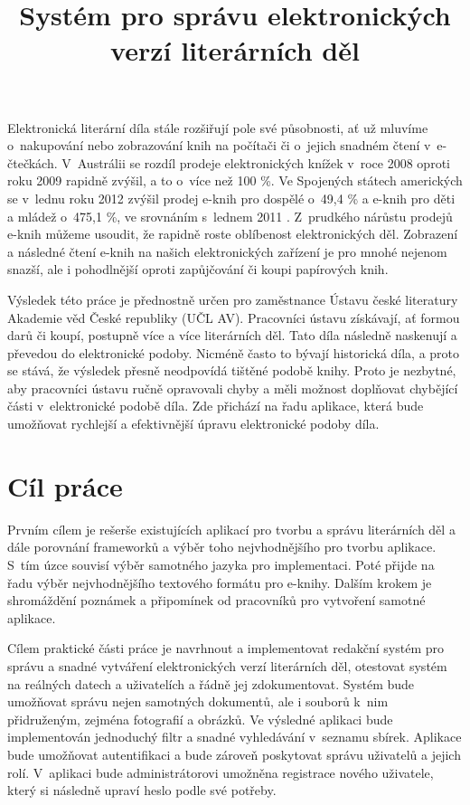 \documentclass[thesis=B,czech]{FITthesis}[2012/06/26]
\title{Systém pro správu elektronických verzí literárních děl}
\begin{document}

\begin{introduction}

    Elektronická literární díla stále rozšiřují pole své působnosti, ať už mluvíme o~nakupování nebo zobrazování knih na počítači či o~jejich snadném čtení v~e-čtečkách. V~Austrálii se rozdíl prodeje elektronických knížek v~roce 2008 oproti roku 2009 rapidně zvýšil, a to o~více než 100 \%. Ve Spojených státech amerických se v~lednu roku 2012 zvýšil prodej e-knih pro dospělé o~49,4 \% a e-knih pro děti a mládež o~475,1 \%, ve srovnáním s~lednem 2011 \cite{info}. Z~prudkého nárůstu prodejů e-knih můžeme usoudit, že rapidně roste oblíbenost elektronických děl. Zobrazení a následné čtení e-knih na našich elektronických zařízení je pro mnohé nejenom snazší, ale i pohodlnější oproti zapůjčování či koupi papírových knih.

	Výsledek této práce je přednostně určen pro zaměstnance Ústavu české literatury Akademie věd České republiky (UČL AV). Pracovníci ústavu získávají, ať formou darů či koupí, postupně více a více literárních děl. Tato díla následně naskenují a převedou do elektronické podoby. Nicméně často to bývají historická díla, a proto se stává, že výsledek přesně neodpovídá tištěné podobě knihy. Proto je nezbytné, aby pracovníci ústavu ručně opravovali chyby a měli možnost doplňovat chybějící části v~elektronické podobě díla. Zde přichází na řadu aplikace, která bude umožňovat rychlejší a efektivnější úpravu elektronické podoby díla.

    \section{Cíl práce}
    
        Prvním cílem je rešerše existujících aplikací pro tvorbu a správu literárních děl a dále porovnání frameworků a výběr toho nejvhodnějšího pro tvorbu aplikace. S~tím úzce souvisí výběr samotného jazyka pro implementaci. Poté přijde na řadu  výběr nejvhodnějšího textového formátu pro e-knihy. Dalším krokem je shromáždění poznámek a připomínek od pracovníků pro vytvoření samotné aplikace.
    
        Cílem praktické části práce je navrhnout a implementovat redakční systém pro správu a snadné vytváření elektronických verzí literárních děl, otestovat systém na reálných datech a uživatelích a řádně jej zdokumentovat. Systém bude umožňovat správu nejen samotných dokumentů, ale i souborů k~nim přidruženým, zejména fotografií a obrázků. Ve výsledné aplikaci bude implementován jednoduchý filtr a snadné vyhledávání v~seznamu sbírek. Aplikace bude umožňovat autentifikaci a bude zároveň poskytovat správu uživatelů a jejich rolí. V~aplikaci bude administrátorovi umožněna registrace nového uživatele, který si následně upraví heslo podle své potřeby.
        

\end{introduction}
\end{document}
